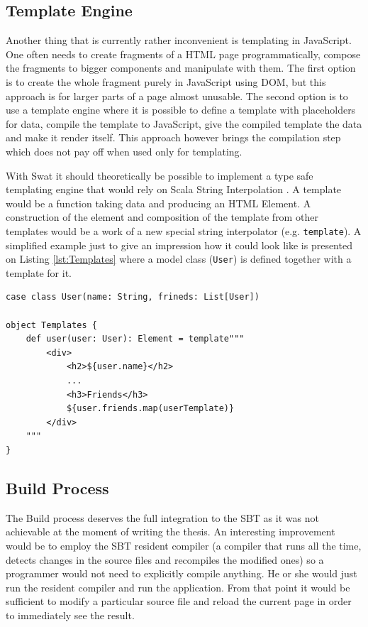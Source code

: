 \documentclass[12pt,a4paper]{report}
\begin{document}
\subsection{Template Engine}

Another thing that is currently rather inconvenient is templating in JavaScript. One often needs to create fragments of a HTML page programmatically, compose the fragments to bigger components and manipulate with them. The first option is to create the whole fragment purely in JavaScript using DOM, but this approach is for larger parts of a page almost unusable. The second option is to use a template engine where it is possible to define a template with placeholders for data, compile the template to JavaScript, give the compiled template the data and make it render itself. This approach however brings the compilation step which does not pay off when used only for templating.

With Swat it should theoretically be possible to implement a type safe templating engine that would rely on Scala String Interpolation \cite{StringInterpolation}. A template would be a function taking data and producing an HTML Element. A construction of the element and composition of the template from other templates would be a work of a new special string interpolator (e.g. \texttt{template}). A simplified example just to give an impression how it could look like is presented on Listing \ref{lst:Templates} where a model class (\texttt{User}) is defined together with a template for it.

\begin{minipage}{\linewidth}
\begin{lstlisting}[caption={An example of templating engine.},label={lst:Templates}]
case class User(name: String, frineds: List[User])

object Templates {
    def user(user: User): Element = template"""
        <div>
            <h2>${user.name}</h2>
            ...
            <h3>Friends</h3>
            ${user.friends.map(userTemplate)}
        </div>
    """
}
\end{lstlisting}
\end{minipage}

\subsection{Build Process}

The Build process deserves the full integration to the SBT as it was not achievable at the moment of writing the thesis. An interesting improvement would be to employ the SBT resident compiler (a compiler that runs all the time, detects changes in the source files and recompiles the modified ones) so a programmer would not need to explicitly compile anything. He or she would just run the resident compiler and run the application. From that point it would be sufficient to modify a particular source file and reload the current page in order to immediately see the result.
\end{document}
